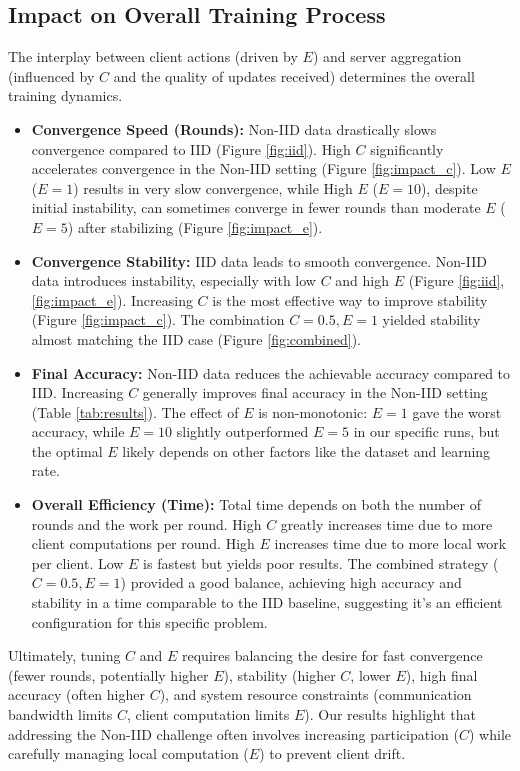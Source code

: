 \documentclass[conference]{IEEEtran}
\begin{document}
\subsection{Impact on Overall Training Process}
The interplay between client actions (driven by $E$) and server aggregation (influenced by $C$ and the quality of updates received) determines the overall training dynamics.
\begin{itemize}
    \item \textbf{Convergence Speed (Rounds):} Non-IID data drastically slows convergence compared to IID (Figure \ref{fig:iid}). High $C$ significantly accelerates convergence in the Non-IID setting (Figure \ref{fig:impact_c}). Low $E$ ($E=1$) results in very slow convergence, while High $E$ ($E=10$), despite initial instability, can sometimes converge in fewer rounds than moderate $E$ ($E=5$) after stabilizing (Figure \ref{fig:impact_e}).
    \item \textbf{Convergence Stability:} IID data leads to smooth convergence. Non-IID data introduces instability, especially with low $C$ and high $E$ (Figure \ref{fig:iid}, \ref{fig:impact_e}). Increasing $C$ is the most effective way to improve stability (Figure \ref{fig:impact_c}). The combination $C=0.5, E=1$ yielded stability almost matching the IID case (Figure \ref{fig:combined}).
    \item \textbf{Final Accuracy:} Non-IID data reduces the achievable accuracy compared to IID. Increasing $C$ generally improves final accuracy in the Non-IID setting (Table \ref{tab:results}). The effect of $E$ is non-monotonic: $E=1$ gave the worst accuracy, while $E=10$ slightly outperformed $E=5$ in our specific runs, but the optimal $E$ likely depends on other factors like the dataset and learning rate.
    \item \textbf{Overall Efficiency (Time):} Total time depends on both the number of rounds and the work per round. High $C$ greatly increases time due to more client computations per round. High $E$ increases time due to more local work per client. Low $E$ is fastest but yields poor results. The combined strategy ($C=0.5, E=1$) provided a good balance, achieving high accuracy and stability in a time comparable to the IID baseline, suggesting it's an efficient configuration for this specific problem.
\end{itemize}
Ultimately, tuning $C$ and $E$ requires balancing the desire for fast convergence (fewer rounds, potentially higher $E$), stability (higher $C$, lower $E$), high final accuracy (often higher $C$), and system resource constraints (communication bandwidth limits $C$, client computation limits $E$). Our results highlight that addressing the Non-IID challenge often involves increasing participation ($C$) while carefully managing local computation ($E$) to prevent client drift.
\end{document}
